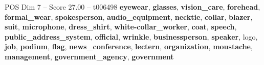 \begin{textsample}{POS Dim 7 – Score 27.00 – t006498}  \label{ex:f7_pos_035}
\textbf{eyewear}, \textbf{glasses}, \textbf{vision\_care}, \textbf{forehead}, \textbf{formal\_wear}, \textbf{spokesperson}, \textbf{audio\_equipment}, \textbf{necktie}, \textbf{collar}, \textbf{blazer}, \textbf{suit}, \textbf{microphone}, \textbf{dress\_shirt}, \textbf{white-collar\_worker}, \textbf{coat}, \textbf{speech}, \textbf{public\_address\_system}, \textbf{official}, \textbf{wrinkle}, \textbf{businessperson}, \textbf{speaker}, logo, \textbf{job}, \textbf{podium}, \textbf{flag}, \textbf{news\_conference}, \textbf{lectern}, \textbf{organization}, \textbf{moustache}, \textbf{management}, \textbf{government\_agency}, \textbf{government}

\end{textsample}
